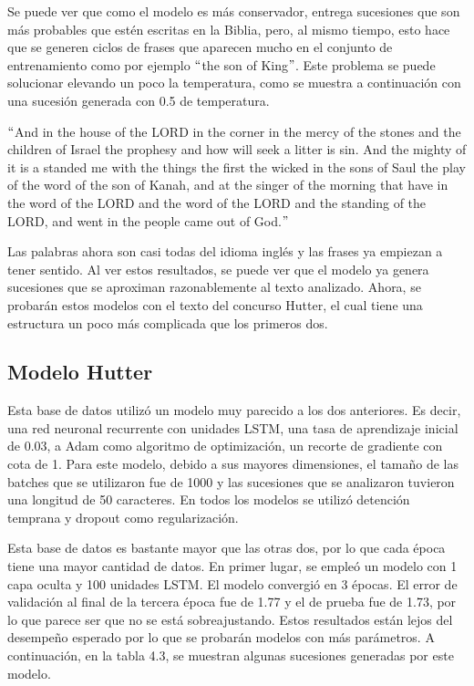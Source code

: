 \vspace{1em}

Se puede ver que como el modelo es más conservador, entrega sucesiones que son más probables que estén escritas en la Biblia, pero, al mismo tiempo, esto hace que se generen ciclos de frases que aparecen mucho en el conjunto de entrenamiento como por ejemplo $``$the son of King$"$. Este problema se puede solucionar elevando un poco la temperatura, como se muestra a continuación con una sucesión generada con 0.5 de temperatura.

\vspace{1em}

 $``$And in the house of the LORD in the corner in the mercy of the stones and the children of Israel the prophesy and how will seek a litter is sin. And the mighty of it is a standed me with the things the first the wicked in the sons of Saul the play of the word of the son of Kanah, and at the singer of the morning that have in the word of the LORD and the word of the LORD and the standing of the LORD, and went in the people came out of God.$"$
 
\vspace{1em}

Las palabras ahora son casi todas del idioma inglés y las frases ya empiezan a tener sentido. Al ver estos resultados, se puede ver que el modelo ya genera sucesiones que se aproximan razonablemente al texto analizado. Ahora, se probarán estos modelos con el texto del concurso Hutter, el cual tiene una estructura un poco más complicada que los primeros dos.

\subsection{Modelo Hutter}
Esta base de datos utilizó un modelo muy parecido a los dos anteriores. Es decir, una red neuronal recurrente con unidades LSTM, una tasa de aprendizaje inicial de 0.03, a Adam como algoritmo de optimización, un recorte de gradiente con cota de 1. Para este modelo, debido a sus mayores dimensiones, el tamaño de las batches que se utilizaron fue de 1000 y las sucesiones que se analizaron tuvieron una longitud de 50 caracteres. En todos los modelos se utilizó detención temprana y dropout como regularización.

\vspace{1em}

Esta base de datos es bastante mayor que las otras dos, por lo que cada época tiene una mayor cantidad de datos. En primer lugar, se empleó un modelo con 1 capa oculta y 100 unidades LSTM. El modelo convergió en 3 épocas. El error de validación al final de la tercera época fue de 1.77 y el de prueba fue de 1.73, por lo que parece ser que no se está sobreajustando. Estos resultados están lejos del desempeño esperado por lo que se probarán modelos con más parámetros. A continuación, en la tabla 4.3, se muestran algunas sucesiones generadas por este modelo. 

